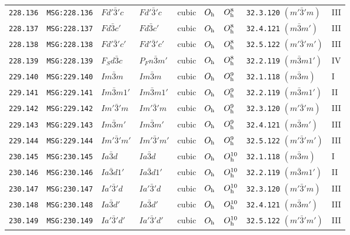 \documentclass[fleqn,10pt]{jsarticle}
\begin{document}
\begin{center}
\begin{longtable}{lllllllll}
\texttt{228.136} & \texttt{MSG:228.136} & $Fd'\bar{3}'c$ & $Fd'\bar{3}'c$ & cubic & $O_{\rm h}$ & $O_{\rm h}^{8}$ & \texttt{32.3.120} $(m'\bar{3}'m)$ & III \\
\texttt{228.137} & \texttt{MSG:228.137} & $Fd\bar{3}c'$ & $Fd\bar{3}c'$ & cubic & $O_{\rm h}$ & $O_{\rm h}^{8}$ & \texttt{32.4.121} $(m\bar{3}m')$ & III \\
\texttt{228.138} & \texttt{MSG:228.138} & $Fd'\bar{3}'c'$ & $Fd'\bar{3}'c'$ & cubic & $O_{\rm h}$ & $O_{\rm h}^{8}$ & \texttt{32.5.122} $(m'\bar{3}'m')$ & III \\
\texttt{228.139} & \texttt{MSG:228.139} & $F_{S}d\bar{3}c$ & $P_{F}n\bar{3}m'$ & cubic & $O_{\rm h}$ & $O_{\rm h}^{8}$ & \texttt{32.2.119} $(m\bar{3}m1')$ & IV \\ \hline
\texttt{229.140} & \texttt{MSG:229.140} & $Im\bar{3}m$ & $Im\bar{3}m$ & cubic & $O_{\rm h}$ & $O_{\rm h}^{9}$ & \texttt{32.1.118} $(m\bar{3}m)$ & I \\
\texttt{229.141} & \texttt{MSG:229.141} & $Im\bar{3}m1'$ & $Im\bar{3}m1'$ & cubic & $O_{\rm h}$ & $O_{\rm h}^{9}$ & \texttt{32.2.119} $(m\bar{3}m1')$ & II \\
\texttt{229.142} & \texttt{MSG:229.142} & $Im'\bar{3}'m$ & $Im'\bar{3}'m$ & cubic & $O_{\rm h}$ & $O_{\rm h}^{9}$ & \texttt{32.3.120} $(m'\bar{3}'m)$ & III \\
\texttt{229.143} & \texttt{MSG:229.143} & $Im\bar{3}m'$ & $Im\bar{3}m'$ & cubic & $O_{\rm h}$ & $O_{\rm h}^{9}$ & \texttt{32.4.121} $(m\bar{3}m')$ & III \\
\texttt{229.144} & \texttt{MSG:229.144} & $Im'\bar{3}'m'$ & $Im'\bar{3}'m'$ & cubic & $O_{\rm h}$ & $O_{\rm h}^{9}$ & \texttt{32.5.122} $(m'\bar{3}'m')$ & III \\ \hline
\texttt{230.145} & \texttt{MSG:230.145} & $Ia\bar{3}d$ & $Ia\bar{3}d$ & cubic & $O_{\rm h}$ & $O_{\rm h}^{10}$ & \texttt{32.1.118} $(m\bar{3}m)$ & I \\
\texttt{230.146} & \texttt{MSG:230.146} & $Ia\bar{3}d1'$ & $Ia\bar{3}d1'$ & cubic & $O_{\rm h}$ & $O_{\rm h}^{10}$ & \texttt{32.2.119} $(m\bar{3}m1')$ & II \\
\texttt{230.147} & \texttt{MSG:230.147} & $Ia'\bar{3}'d$ & $Ia'\bar{3}'d$ & cubic & $O_{\rm h}$ & $O_{\rm h}^{10}$ & \texttt{32.3.120} $(m'\bar{3}'m)$ & III \\
\texttt{230.148} & \texttt{MSG:230.148} & $Ia\bar{3}d'$ & $Ia\bar{3}d'$ & cubic & $O_{\rm h}$ & $O_{\rm h}^{10}$ & \texttt{32.4.121} $(m\bar{3}m')$ & III \\
\texttt{230.149} & \texttt{MSG:230.149} & $Ia'\bar{3}'d'$ & $Ia'\bar{3}'d'$ & cubic & $O_{\rm h}$ & $O_{\rm h}^{10}$ & \texttt{32.5.122} $(m'\bar{3}'m')$ & III \\
\end{longtable}
\end{center}
\end{document}
